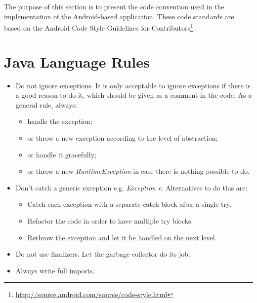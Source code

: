 \lstset{language=Java}

The purpose of this section is to present the code convention used in the implementation of the Android-based application. These code standards are based
on the Android Code Style Guidelines for Contributors\footnote{\url{http://source.android.com/source/code-style.html}}.

\section{Java Language Rules}

\begin{itemize}
  \item Do not ignore exceptions. It is only acceptable to ignore exceptions if there is a good reason to do it, which should be given as a comment in the code. As a general rule, always:
  \begin{itemize}
   \item handle the exception;
   \item or throw a new exception according to the level of abstraction;
   \item or handle it gracefully;
   \item or throw a new \textit{RuntimeException} in case there is nothing possible to do.
  \end{itemize}
  \item Don't catch a generic exception e.g. \textit{Exception e}. Alternatives to do this are:
 \begin{itemize}
    \item Catch each exception with a separate catch block after a single try.
    \item Refactor the code in order to have multiple try blocks.
    \item Rethrow the exception and let it be handled on the next level.
  \end{itemize}
  \item Do not use finalizers. Let the garbage collector do its job.
  \item Always write full imports.
  

\end{itemize}
